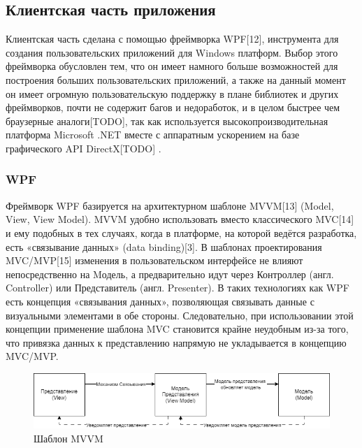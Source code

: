 \documentclass[12pt]{article}
\begin{document}
\subsection{Клиентская часть приложения}
\qquad Клиентская часть сделана с помощью фреймворка WPF[12], инструмента для создания пользовательских приложений для Windows платформ. Выбор этого фреймворка обусловлен тем, что он имеет намного больше возможностей для построения больших пользовательских приложений, а также на данный момент он имеет огромную пользовательскую поддержку в плане библиотек и других фреймворков, почти не содержит багов и недоработок, и в целом быстрее чем браузерные аналоги[TODO], так как используется высокопроизводительная платформа Microsoft .NET вместе с аппаратным ускорением на базе графического API DirectX[TODO] .\par

\subsubsection{WPF}
\qquad Фреймворк WPF базируется на архитектурном шаблоне MVVM[13] (Model, View, View Model). MVVM удобно использовать вместо классического MVC[14] и ему подобных в тех случаях, когда в платформе, на которой ведётся разработка, есть «связывание данных» (data binding)[3]. В шаблонах проектирования MVC/MVP[15] изменения в пользовательском интерфейсе не влияют непосредственно на Mодель, а предварительно идут через Контроллер (англ. Controller) или Представитель (англ. Presenter). В таких технологиях как WPF есть концепция «связывания данных», позволяющая связывать данные с визуальными элементами в обе стороны. Следовательно, при использовании этой концепции применение шаблона MVC становится крайне неудобным из-за того, что привязка данных к представлению напрямую не укладывается в концепцию MVC/MVP.\par

\begin{figure}[!ht]
    \centering
    \includegraphics[width=1\textwidth]{_images/mvvm.png}
    \caption{Шаблон MVVM}
\end{figure}
\end{document}
